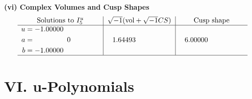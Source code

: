 \documentclass[1p]{elsarticle_modified}
\theoremstyle{definition}
\newcommand{\I}{\sqrt{-1}}
\begin{document}
\newpage\flushleft \textbf{(vi) Complex Volumes and Cusp Shapes}
$$\begin{array}{c|c|c}  
\text{Solutions to }I^u_{5}& \I (\text{vol} + \sqrt{-1}CS) & \text{Cusp shape}\\
 \hline 
\begin{aligned}
u &= -1.00000\phantom{ +0.000000I} \\
a &= \phantom{-0.000000 } 0 \\
b &= -1.00000\phantom{ +0.000000I}\end{aligned}
 & \phantom{-}1.64493\phantom{ +0.000000I} & \phantom{-}6.00000\phantom{ +0.000000I}\\
 \hline 
 \end{array}$$\newpage
\newpage\renewcommand{\arraystretch}{1}
\centering \section*{ VI. u-Polynomials}
\end{document}
